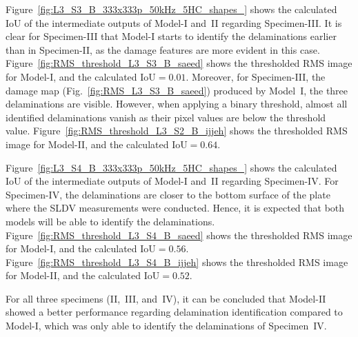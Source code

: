 \begin{sloppypar}
	Figure~\ref{fig:L3_S3_B_333x333p_50kHz_5HC_shapes_} shows the calculated IoU of the intermediate outputs of Model-I and~II regarding Specimen-III.
	It is clear for Specimen-III that Model-I starts to identify the delaminations earlier than in Specimen-II, as the damage features are more evident in this case.
	Figure~\ref{fig:RMS_threshold_L3_S3_B_saeed} shows the thresholded RMS image for Model-I, and the calculated IoU\(=0.01\).
	Moreover, for Specimen-III, the damage map (Fig.~\ref{fig:RMS_L3_S3_B_saeed}) produced by Model~I, the three delaminations are visible.
	However, when applying a binary threshold, almost all identified delaminations vanish as their pixel values are below the threshold value.
	Figure~\ref{fig:RMS_threshold_L3_S2_B_ijjeh} shows the thresholded RMS image for Model-II, and the calculated IoU\(=0.64\).
	
	Figure~\ref{fig:L3_S4_B_333x333p_50kHz_5HC_shapes_} shows the calculated IoU of the intermediate outputs of Model-I and~II regarding Specimen-IV.
	For Specimen-IV, the delaminations are closer to the bottom surface of the plate where the SLDV measurements were conducted.
	Hence, it is expected that both models will be able to identify the delaminations.
	Figure~\ref{fig:RMS_threshold_L3_S4_B_saeed} shows the thresholded RMS image for Model-I, and the calculated IoU\(=0.56\).
	Figure~\ref{fig:RMS_threshold_L3_S4_B_ijjeh} shows the thresholded RMS image for Model-II, and the calculated IoU\(=0.52\).
	
	For all three specimens (II,~III, and~IV), it can be concluded that Model-II showed a better performance regarding delamination identification compared to Model-I, which was only able to identify the delaminations of Specimen~IV.


\end{sloppypar}
